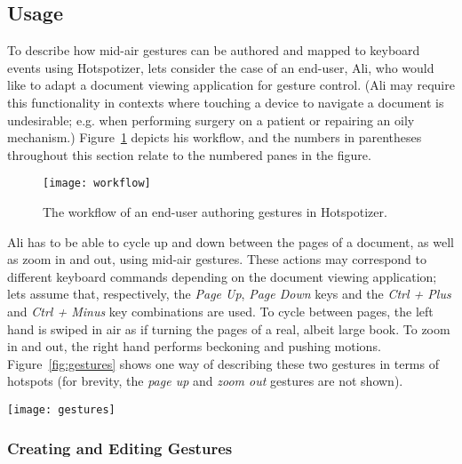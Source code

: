 \subsection{Usage}

To describe how mid-air gestures can be authored and mapped to keyboard events using Hotspotizer, lets consider the case of an end-user, Ali, who would like to adapt a document viewing application for gesture control. (Ali may require this functionality in contexts where touching a device to navigate a document is undesirable; e.g. when performing surgery on a patient or repairing an oily mechanism.) Figure~\ref{fig:workflow} depicts his workflow, and the numbers in parentheses throughout this section relate to the numbered panes in the figure.

\begin{figure}[ht]
\centering
\texttt{[image: workflow]}
\caption{The workflow of an end-user authoring gestures in Hotspotizer.}
\label{fig:workflow}
\end{figure}

Ali has to be able to cycle up and down between the pages of a document, as well as zoom in and out, using mid-air gestures. These actions may correspond to different keyboard commands depending on the document viewing application; lets assume that, respectively, the \emph{Page Up}, \emph{Page Down} keys and the \emph{Ctrl + Plus} and \emph{Ctrl + Minus} key combinations are used. To cycle between pages, the left hand is swiped in air as if turning the pages of a real, albeit large book. To zoom in and out, the right hand performs beckoning and pushing motions. Figure~\ref{fig:gestures} shows one way of describing these two gestures in terms of hotspots (for brevity, the \emph{page up} and \emph{zoom out} gestures are not shown).

\begin{SCfigure}[\sidecaptionrelwidth][ht]
\centering
\texttt{[image: gestures]}
\caption{\emph{Next page} and \emph{zoom in} gestures to control a document viewing application and the keyboard functionality that they map to. The diagrams show, respectively, hotspot arrangements for a swipe gesture and a beckoning motion.}
\label{fig:gestures}
\end{SCfigure}

\subsubsection{Creating and Editing Gestures}

